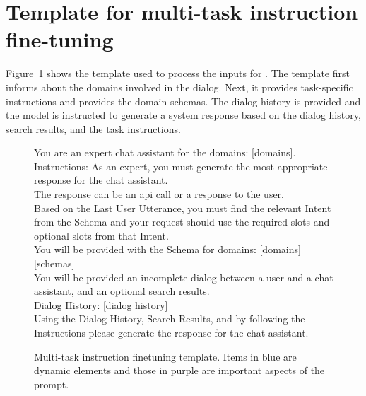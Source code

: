 \section{Template for multi-task instruction fine-tuning}
\label{sec:templates}

Figure~\ref{fig:finetuning_template} shows the template used to process the inputs for {\oursys}. The template first informs about the domains involved in the dialog. Next, it provides task-specific instructions and provides the domain schemas. The dialog history is provided and the model is instructed to generate a system response based on the dialog history, search results, and the task instructions.



\begin{figure}[htbp]
    \centering
\begin{tcolorbox}[colframe=gray!20, colback=gray!10, coltitle=black, arc=5mm, boxrule=0.4mm, width=\columnwidth, left=3mm, right=3mm, top=3mm, bottom=3mm]
\setlength{\baselineskip}{1.5em}
You are an expert chat assistant for the domains: \textcolor{cyan!90}{[domains]}. \\
\textcolor{purple!90}{Instructions:} As an expert, you must generate the most appropriate response for the chat assistant. \\
The response can be an api call or a response to the user. \\
Based on the \textcolor{purple!90}{Last User Utterance}, you must find the relevant \textcolor{purple!90}{Intent} from the \textcolor{purple!90}{Schema} and your request should use the \textcolor{purple!90}{required slots} and \textcolor{purple!90}{optional slots} from that \textcolor{purple!90}{Intent}. \\
You will be provided with the Schema for domains: \textcolor{cyan!90}{[domains]}\\
\textcolor{cyan!90}{[schemas]}\\
You will be provided an incomplete dialog between a user and a chat assistant, and an optional search results.\\
\textcolor{purple!90}{Dialog History}: \textcolor{cyan!90}{[dialog history]}\\
Using the \textcolor{purple!90}{Dialog History}, \textcolor{purple!90}{Search Results}, and by following the \textcolor{purple!90}{Instructions} please generate the response for the chat assistant.
\end{tcolorbox}
    \caption{Multi-task instruction finetuning template. Items in blue are dynamic elements and those in purple are important aspects of the prompt.}
    \label{fig:finetuning_template}
\end{figure}